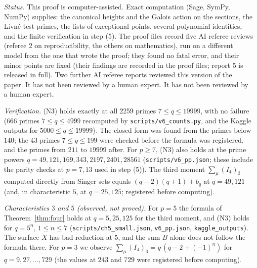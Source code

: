 \documentclass[11pt]{article}
\begin{document}
\emph{Status.} This proof is computer-assisted. Exact computation (Sage, SymPy, NumPy) supplies: the canonical heights and the Galois action on the sections, the Livn\'e test primes, the lists of exceptional points, several polynomial identities, and the finite verification in step (5). The proof files record five AI referee reviews (referee 2 on reproducibility, the others on mathematics), run on a different model from the one that wrote the proof; they found no fatal error, and their minor points are fixed (their findings are recorded in the proof files; report 5 is released in full). Two further AI referee reports reviewed this version of the paper. It has not been reviewed by a human expert. It has not been reviewed by a human expert.

\emph{Verification.} (N3) holds exactly at all 2259 primes $7\le q\le19999$, with no failure (666 primes $7\le q\le4999$ recomputed by \texttt{scripts/v6\_counts.py}, and the Kaggle outputs for $5000\le q\le19999$). The closed form was found from the primes below $140$; the $43$ primes $7\le q\le199$ were checked before the formula was registered, and the primes from $211$ to $19999$ after.
For $p\ge7$, (N3) also holds at the prime powers $q=49,121,169,343,2197,2401,28561$ (\texttt{scripts/v6\_pp.json}; these include the parity checks at $p=7,13$ used in step (5)). The third moment $\sum_\mu(I_4)_3$ computed directly from Singer sets equals $(q-2)(q+1)+b_q$ at $q=49,121$ (and, in characteristic $5$, at $q=25,125$; registered before computing).

\emph{Characteristics $3$ and $5$ (observed, not proved).} For $p=5$ the formula of Theorem~\ref{thm:four} holds at $q=5,25,125$ for the third moment, and (N3) holds for $q=5^n$, $1\le n\le7$ (\texttt{scripts/ch5\_small.json}, \texttt{v6\_pp.json}, \texttt{kaggle\_outputs}). The surface $X$ has bad reduction at $5$, and the sum $B$ alone does not follow the formula there.
For $p=3$ we observe $\sum_\mu(I_4)_3=q\,(q-2+(-1)^n)$ for $q=9,27,\dots,729$ (the values at $243$ and $729$ were registered before computing).
\end{document}
